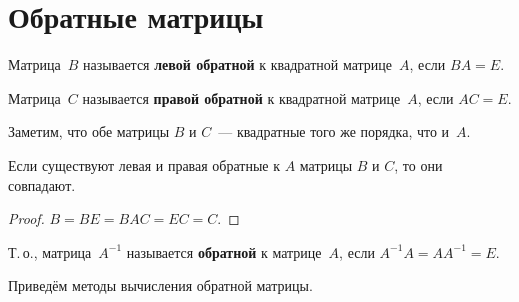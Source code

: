 \section{Обратные матрицы}
Матрица~$B$ называется \textbf{левой обратной} к квадратной матрице~$A$, если $BA = E$.

Матрица~$C$ называется \textbf{правой обратной} к квадратной матрице~$A$, если $AC = E$.

Заметим, что обе матрицы $B$ и $C$~--- квадратные того же порядка, что и~$A$.

\begin{statement}
Если существуют левая и правая обратные к $A$ матрицы $B$ и $C$, то они совпадают.
\end{statement}
\begin{proof}
$B = BE = BAC = EC = C$.
\end{proof}

 Т.\,о., матрица~$A^{-1}$ называется \textbf{обратной} к матрице~$A$, если $A^{-1} A = A A^{-1} = E$.

Приведём методы вычисления обратной матрицы.

